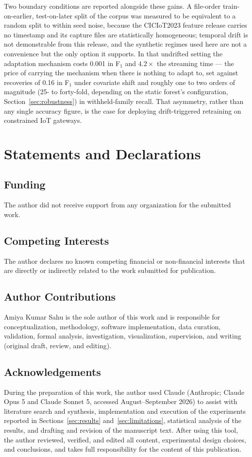 \documentclass[11pt,a4paper]{article}
\begin{document}
Two boundary conditions are reported alongside these gains. A file-order
train-on-earlier, test-on-later split of the corpus was measured to be
equivalent to a random split to within seed noise, because the CICIoT2023
feature release carries no timestamp and its capture files are statistically
homogeneous; temporal drift is not demonstrable from this release, and the
synthetic regimes used here are not a convenience but the only option it
supports. In that undrifted setting the adaptation mechanism costs 0.001 in
F$_1$ and $4.2\times$ the streaming time --- the price of carrying the
mechanism when there is nothing to adapt to, set against recoveries of 0.16 in
F$_1$ under covariate shift and roughly one to two orders of magnitude (25- to
forty-fold, depending on the static forest's configuration,
Section~\ref{sec:robustness}) in withheld-family recall. That asymmetry,
rather than any single accuracy figure, is the case for deploying
drift-triggered retraining on constrained IoT gateways.

\section*{Statements and Declarations}

\subsection*{Funding}
The author did not receive support from any organization for the
submitted work.

\subsection*{Competing Interests}
The author declares no known competing financial or
non-financial interests that are directly or indirectly related to the
work submitted for publication.

\subsection*{Author Contributions}
Amiya Kumar Sahu is the sole author of this work and is responsible for
conceptualization, methodology, software implementation, data curation,
validation, formal analysis, investigation, visualization, supervision,
and writing (original draft, review, and editing).

\subsection*{Acknowledgements}
During the preparation of this work, the author used Claude (Anthropic;
Claude Opus 5 and Claude Sonnet 5, accessed August--September 2026) to
assist with literature search and synthesis, implementation and execution
of the experiments reported in Sections~\ref{sec:results}
and~\ref{sec:limitations}, statistical analysis of the results, and
drafting and revision of the manuscript text. After using this tool, the
author reviewed, verified, and edited all content, experimental design
choices, and conclusions, and takes full responsibility for the content
of this publication.
\end{document}
